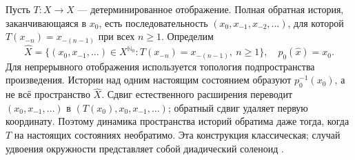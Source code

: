 \section{}
\label{sec:deterministic}
{Пусть $T:X\to X$ --- детерминированное отображение. Полная обратная история, заканчивающаяся в $x_0$, есть последовательность $(x_0,x_{-1},x_{-2},\ldots)$, для которой $T(x_{-n})=x_{-(n-1)}$ при всех $n\ge1$. Определим}
\begin{equation}\label{eq:natural-extension}
\widehat X=\{(x_0,x_{-1},\ldots)\in X^{\mathbb N_0}:T(x_{-n})=x_{-(n-1)},\ n\ge1\},
\quad p_0(\widehat x)=x_0.
\end{equation}
{Для непрерывного отображения используется топология подпространства произведения. Истории над одним настоящим состоянием образуют $p_0^{-1}(x_0)$, а не всё пространство $\widehat X$. Сдвиг естественного расширения переводит $(x_0,x_{-1},\ldots)$ в $(T(x_0),x_0,x_{-1},\ldots)$; обратный сдвиг удаляет первую координату. Поэтому динамика пространства историй обратима даже тогда, когда $T$ на настоящих состояниях необратимо. Эта конструкция классическая; случай удвоения окружности представляет собой диадический соленоид \cite[Section 1]{ClarkFokkink2004}.}

